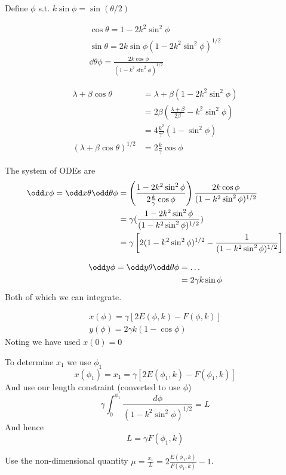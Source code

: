 \documentclass{E:/Documents/Latex/myassignment}
\begin{document}
Define $\phi$ s.t. $k \sin\phi = \sin(\theta/2)$

\begin{align*}
	\cos\theta = 1-2k^2\sin^2\phi\\ 
	\sin\theta = 2k \sin\phi (1- 2k^2\sin^2\phi)^{1/2}\\
	\dd\theta\phi = \frac{2k\cos\phi}{(1-k^2\sin^2\phi)^{1/2}}
\end{align*}

\begin{align*}
	\lambda + \beta \cos\theta &= \lambda + \beta(1 - 2k^2 \sin^2\phi)\\
	&= 2 \beta (\frac{\lambda + \beta}{2 \beta} - k^2 \sin^2\phi)\\
	&= 4 \frac{k^2}{\gamma^2} (1-\sin^2\phi)\\
	(\lambda + \beta\cos\theta)^{1/2} &= 2\frac{k}{\gamma} \cos\phi
\end{align*}

The system of ODEs are
\begin{align*}
	\odd x\phi = \odd x\theta \odd \theta\phi &= \left(\frac{1 - 2k^2 \sin^2\phi}{2\frac k \gamma \cos\phi}\right) \frac{2k \cos\phi}{(1- k^2 \sin^2 \phi)^{1/2}}\\
	&= \gamma (\frac{1 - 2 k^2 \sin^2\phi }{(1 - k^2 \sin^2\phi)^{1/2} })\\
	&= \gamma \left[2 (1 - k^2 \sin^2\phi)^{1/2} - \frac{1}{(1 - k^2 \sin^2\phi )^{1/2}}\right]
\end{align*}

\begin{align*}
	\odd y\phi = \odd y\theta \odd \theta\phi &= \ldots\\
	&= 2 \gamma k \sin \phi
\end{align*}
Both of which we can integrate.

\begin{align*}
	x(\phi) = \gamma\left[2 E(\phi,k) - F(\phi,k)\right]\\
	y(\phi) = 2 \gamma k (1- \cos\phi)
\end{align*}
Noting we have used $x(0) = 0$

To determine $x_1$ we use $\phi_1$
\[x(\phi_1) = x_1 = \gamma[2 E(\phi_1,k) - F(\phi_1,k)]\]
And use our length constraint (converted to use $\phi$)
\[\gamma\int_0^{\phi_1} \frac{d\phi}{(1 - k^2 \sin^2\phi )^{1/2}} = L\]
And hence
\[L = \gamma F(\phi_1,k)\]


Use the non-dimensional quantity $\mu = \frac{x_1}{L} = 2 \frac{E(\phi_1,k)}{F(\phi_1,k)} -1$.
\end{document}
